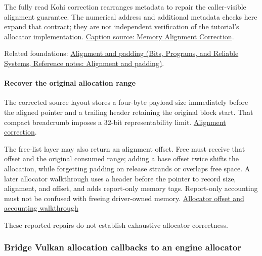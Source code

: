 The fully read Kohi correction rearranges metadata to repair the caller-visible alignment guarantee. The numerical address and additional metadata checks here expand that contract; they are not independent verification of the tutorial's allocator implementation. \href{https://www.youtube.com/watch?v=VQ6Q9B_WDlM}{Caption source: Memory Alignment Correction}.

Related foundations: \href{../01-Bits-Programs-and-Reliable-Systems/main.pdf\#nameddest=appendix-a1f7c53b4742}{Alignment and padding (Bits, Programs, and Reliable Systems, Reference notes: Alignment and padding)}.

\paragraph{Recover the original allocation range}\label{05-engine-i-ch014-recover-the-original-allocation-range}

\hypertarget{05-engine-i-ch014-recover-the-original-allocation-range}{}

The corrected source layout stores a four-byte payload size immediately before the aligned pointer and a trailing header retaining the original block start. That compact breadcrumb imposes a 32-bit representability limit. \href{https://www.youtube.com/watch?v=VQ6Q9B_WDlM}{Alignment correction}.

The free-list layer may also return an alignment offset. Free must receive that offset and the original consumed range; adding a base offset twice shifts the allocation, while forgetting padding on release strands or overlaps free space. A later allocator walkthrough uses a header before the pointer to record size, alignment, and offset, and adds report-only memory tags. Report-only accounting must not be confused with freeing driver-owned memory. \href{https://www.youtube.com/watch?v=Fo9ri9DMu74}{Allocator offset and accounting walkthrough}

These reported repairs do not establish exhaustive allocator correctness.

\subsubsection{Bridge Vulkan allocation callbacks to an engine allocator}\label{05-engine-i-ch014-bridge-vulkan-allocation-callbacks-to-an-engine-allocator}

\hypertarget{05-engine-i-ch014-bridge-vulkan-allocation-callbacks-to-an-engine-allocator}{}

